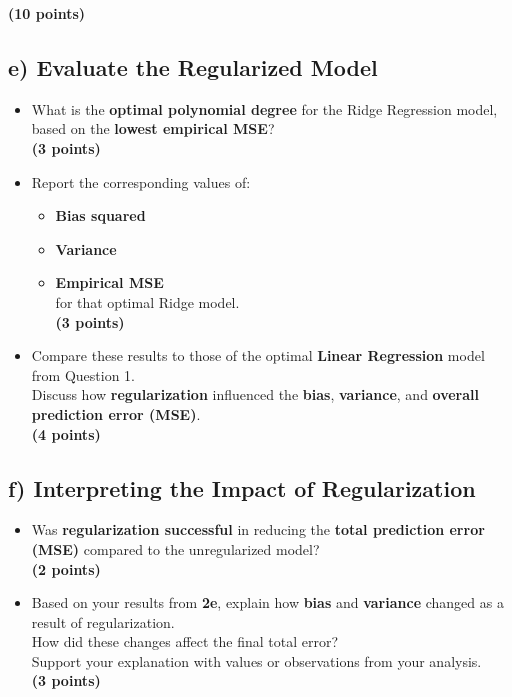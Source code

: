 \documentclass[
  letterpaper,
  DIV=11,
  numbers=noendperiod]{scrreprt}
\providecommand{\tightlist}{%
  \setlength{\itemsep}{0pt}\setlength{\parskip}{0pt}}\usepackage{longtable,booktabs,array}
\begin{document}
\textbf{(10 points)}

\subsection{e) Evaluate the Regularized
Model}\label{e-evaluate-the-regularized-model}

\begin{itemize}
\item
  What is the \textbf{optimal polynomial degree} for the Ridge
  Regression model, based on the \textbf{lowest empirical MSE}?\\
  \textbf{(3 points)}
\item
  Report the corresponding values of:

  \begin{itemize}
  \tightlist
  \item
    \textbf{Bias squared}\\
  \item
    \textbf{Variance}\\
  \item
    \textbf{Empirical MSE}\\
    for that optimal Ridge model.\\
    \textbf{(3 points)}
  \end{itemize}
\item
  Compare these results to those of the optimal \textbf{Linear
  Regression} model from Question 1.\\
  Discuss how \textbf{regularization} influenced the \textbf{bias},
  \textbf{variance}, and \textbf{overall prediction error (MSE)}.\\
  \textbf{(4 points)}
\end{itemize}

\subsection{f) Interpreting the Impact of
Regularization}\label{f-interpreting-the-impact-of-regularization}

\begin{itemize}
\item
  Was \textbf{regularization successful} in reducing the \textbf{total
  prediction error (MSE)} compared to the unregularized model?\\
  \textbf{(2 points)}
\item
  Based on your results from \textbf{2e}, explain how \textbf{bias} and
  \textbf{variance} changed as a result of regularization.\\
  How did these changes affect the final total error?\\
  Support your explanation with values or observations from your
  analysis.\\
  \textbf{(3 points)}
\end{itemize}
\end{document}

